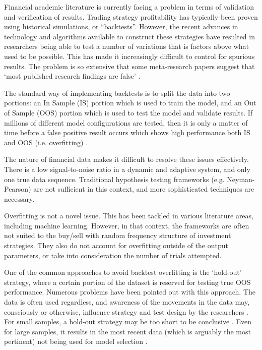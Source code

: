 \documentclass[a4paper,11pt,oneside]{article}
\theoremstyle{plain}
\theoremstyle{definition}
\begin{document}
	Financial academic literature is currently facing a problem in terms of validation and verification of results. 
	Trading strategy profitability has typically been proven using historical simulations, or 
	``backtests''. However, 
	the recent advances in technology and algorithms available 
	to construct these strategies have resulted in researchers being able to test a number of variations that is factors 
	above what used to be possible. This has made it increasingly difficult to control for spurious results. 
	The problem is so extensive that some meta-research papers suggest that ‘most published research findings are false’ \citep{Ioannidis}.
	\hfill \break 
	
	The standard way of implementing backtests is to split the data into two portions: an In Sample (IS) portion which
	is used to train the model, and an Out of Sample (OOS) portion which is used to test the model and validate results. 
	If millions of different model configurations are tested, then it is only a matter of time before a false positive result occurs which shows high performance both IS and OOS (i.e. overfitting) \citep{BailyPBO, McLean}. 
	\hfill \break 
	
	The nature of financial data makes it difficult to resolve these issues effectively. There is a low signal-to-noise ratio in a dynamic and adaptive system, and 
	only one true data sequence. Traditional hypothesis testing frameworks (e.g. Neyman-Pearson) are not sufficient in this context, and more sophisticated techniques are necessary.
	\hfill \break 
	
	Overfitting is not a novel issue. This has been tackled in various literature areas, including machine learning. 
	However, in that context, the frameworks are often not suited to the buy/sell with random frequency structure of 
	investment strategies. They also do not account for overfitting outside of the output parameters, or take into 
	consideration the number of trials attempted.
	
	\hfill \break 	
	One of the common approaches to avoid backtest overfitting is the `hold-out' strategy, where a certain portion of 
	the dataset is reserved for testing true OOS performance. Numerous problems have been pointed out with this 
	approach. The data is often used regardless, and awareness of the movements in the data may, 
	consciously or otherwise, influence strategy and test design by the researchers \citep{Schorfheide}. For small samples, 
	a hold-out strategy may be too short to be conclusive \citep{Weiss}. Even for large samples, it results in the 
	most recent data (which is arguably the most pertinent) not being used for model selection \citep{Hawkins, BailyPBO}.
	\hfill \break 
	
\end{document}
